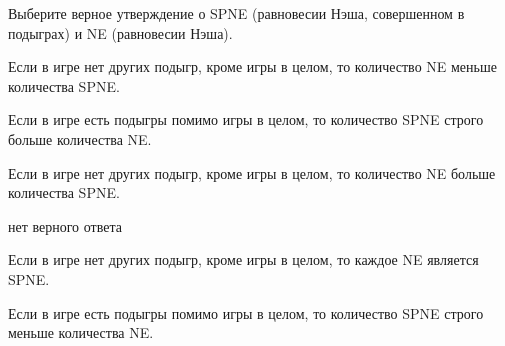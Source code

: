 
\begin{question}
Выберите верное утверждение о SPNE (равновесии Нэша, совершенном в
подыграх) и NE (равновесии Нэша).
\begin{answerlist}
  \item Если в игре нет других подыгр, кроме игры в целом, то количество NE
меньше количества SPNE.
  \item Если в игре есть подыгры помимо игры в целом, то количество SPNE строго
больше количества NE.
  \item Если в игре нет других подыгр, кроме игры в целом, то количество NE
больше количества SPNE.
  \item нет верного ответа
  \item Если в игре нет других подыгр, кроме игры в целом, то каждое NE является
SPNE.
  \item Если в игре есть подыгры помимо игры в целом, то количество SPNE строго
меньше количества NE.
\end{answerlist}
\end{question}


